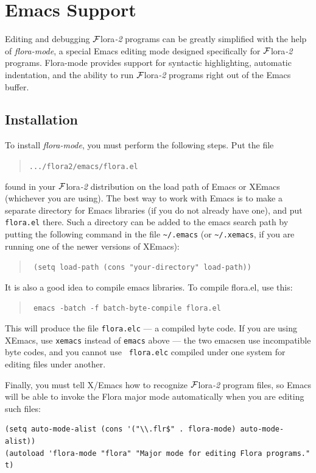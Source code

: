 \documentclass[11pt]{article}
\newcommand{\FLORA}{{\mbox{\sc ${\cal F}${lora}\rm\emph{-2}}}\xspace}
\begin{document}
\newpage
\section{Emacs Support}

Editing and debugging \FLORA programs can be greatly simplified with the
help of \emph{flora-mode}, a special Emacs editing mode designed
specifically for \FLORA programs. Flora-mode provides support for syntactic
highlighting, automatic indentation, and the ability to run \FLORA programs
right out of the Emacs buffer.


\subsection{Installation}


To install \emph{flora-mode}, you must perform the following steps. Put the
file
\begin{quote}
  {\tt .../flora2/emacs/flora.el} 
\end{quote}
found in your \FLORA distribution on the load path of Emacs or XEmacs
(whichever you are using). The best way to work with Emacs is to make a
separate directory for Emacs libraries (if you do not already have one), and put
{\tt flora.el} there. Such a directory can be added to the emacs search path by
putting the following command in the file \verb|~/.emacs| (or
\verb|~/.xemacs|, if you are running one of the newer versions of XEmacs):
\begin{quote}
  \tt
   (setq load-path (cons "your-directory" load-path)) 
\end{quote}
It is also a good idea to compile emacs libraries. To compile flora.el,
use this:
\begin{quote}
  \tt
   emacs -batch -f batch-byte-compile flora.el 
\end{quote}
This will produce the file {\tt flora.elc} --- a compiled byte code.
If you are using XEmacs, use {\tt xemacs} instead of {\tt emacs} above ---
the two emacsen use incompatible byte codes, and you cannot use {\tt
  flora.elc} compiled under one system for editing files under another.

Finally, you must tell X/Emacs how to recognize \FLORA program files, so
Emacs will be able to invoke the Flora major mode automatically when you
are editing such files:
\begin{verbatim}
(setq auto-mode-alist (cons '("\\.flr$" . flora-mode) auto-mode-alist))
(autoload 'flora-mode "flora" "Major mode for editing Flora programs." t)
\end{verbatim}
\end{document}

